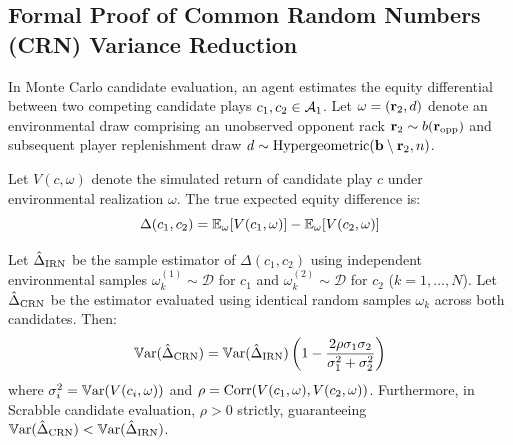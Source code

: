 \subsection{Formal Proof of Common Random Numbers (CRN) Variance Reduction}
\label{app:proof_crn}

In Monte Carlo candidate evaluation, an agent estimates the equity differential between two competing candidate plays $c_1, c_2 \in \mathcal{A}_1$. Let $\omega = (\mathbf{r}_2, d)$ denote an environmental draw comprising an unobserved opponent rack $\mathbf{r}_2 \sim b(\mathbf{r}_{\mathrm{opp}})$ and subsequent player replenishment draw $d \sim \mathrm{Hypergeometric}(\mathbf{b} \setminus \mathbf{r}_2, n)$.

Let $V(c, \omega)$ denote the simulated return of candidate play $c$ under environmental realization $\omega$. The true expected equity difference is:
\begin{equation}
    \Delta(c_1, c_2) = \mathbb{E}_\omega [V(c_1, \omega)] - \mathbb{E}_\omega [V(c_2, \omega)]
\end{equation}

\begin{theorem}
\label{thm:crn_variance}
Let $\hat{\Delta}_{\mathrm{IRN}}$ be the sample estimator of $\Delta(c_1, c_2)$ using independent environmental samples $\omega^{(1)}_k \sim \mathcal{D}$ for $c_1$ and $\omega^{(2)}_k \sim \mathcal{D}$ for $c_2$ ($k = 1, \dots, N$). Let $\hat{\Delta}_{\mathrm{CRN}}$ be the estimator evaluated using identical random samples $\omega_k$ across both candidates.
Then:
\begin{equation}
    \mathbb{V}\mathrm{ar}(\hat{\Delta}_{\mathrm{CRN}}) = \mathbb{V}\mathrm{ar}(\hat{\Delta}_{\mathrm{IRN}}) \left( 1 - \frac{2 \rho \sigma_1 \sigma_2}{\sigma_1^2 + \sigma_2^2} \right)
\end{equation}
where $\sigma_i^2 = \mathbb{V}\mathrm{ar}(V(c_i, \omega))$ and $\rho = \mathrm{Corr}(V(c_1, \omega), V(c_2, \omega))$. Furthermore, in Scrabble candidate evaluation, $\rho > 0$ strictly, guaranteeing $\mathbb{V}\mathrm{ar}(\hat{\Delta}_{\mathrm{CRN}}) < \mathbb{V}\mathrm{ar}(\hat{\Delta}_{\mathrm{IRN}})$.
\end{theorem}

